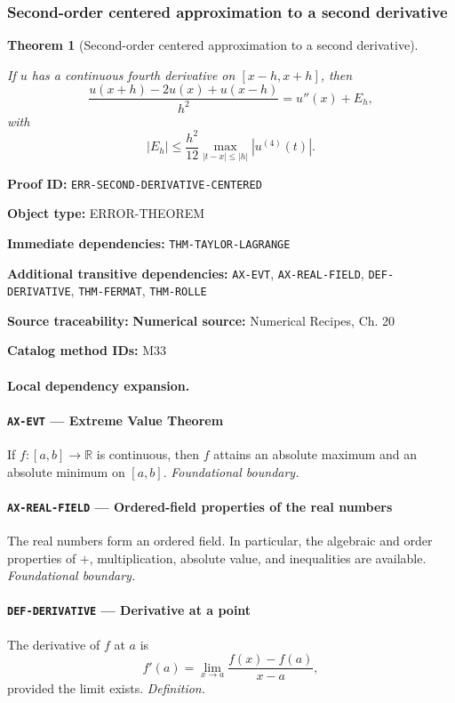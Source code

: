 \documentclass[10pt]{article}
\newcommand{\pidraw}[1]{\begingroup\urlstyle{tt}\nolinkurl{#1}\endgroup}
\newtheorem{theorem}{Theorem}[section]
\theoremstyle{definition}
\theoremstyle{remark}
\newcommand{\meta}[2]{\noindent\textbf{#1:} #2\par}
\begin{document}
\subsubsection{Second-order centered approximation to a second derivative}

\begin{theorem}[Second-order centered approximation to a second derivative]\label{prf:ERR-SECOND-DERIVATIVE-CENTERED}

If $u$ has a continuous fourth derivative on $[x-h,x+h]$, then
\[
\frac{u(x+h)-2u(x)+u(x-h)}{h^2}
=
u''(x)+E_h,
\]
with
\[
|E_h|
\le
\frac{h^2}{12}
\max_{|t-x|\le |h|}|u^{(4)}(t)|.
\]

\end{theorem}

\meta{Proof ID}{\pidraw{ERR-SECOND-DERIVATIVE-CENTERED}}
\meta{Object type}{ERROR-THEOREM}
\meta{Immediate dependencies}{\pidraw{THM-TAYLOR-LAGRANGE}}
\meta{Additional transitive dependencies}{\pidraw{AX-EVT}, \pidraw{AX-REAL-FIELD}, \pidraw{DEF-DERIVATIVE}, \pidraw{THM-FERMAT}, \pidraw{THM-ROLLE}}
\meta{Source traceability}{\textbf{Numerical source:} Numerical Recipes, Ch. 20}
\meta{Catalog method IDs}{M33}

\paragraph{Local dependency expansion.}

\paragraph{\pidraw{AX-EVT} --- Extreme Value Theorem}
If $f:[a,b]\to\mathbb{R}$ is continuous, then $f$ attains an absolute maximum and an absolute minimum on $[a,b]$.
\textit{Foundational boundary.}

\paragraph{\pidraw{AX-REAL-FIELD} --- Ordered-field properties of the real numbers}
The real numbers form an ordered field. In particular, the algebraic and order properties of $+$, multiplication, absolute value, and inequalities are available.
\textit{Foundational boundary.}

\paragraph{\pidraw{DEF-DERIVATIVE} --- Derivative at a point}
The derivative of $f$ at $a$ is
\[
f'(a)=\lim_{x\to a}\frac{f(x)-f(a)}{x-a},
\]
provided the limit exists.
\textit{Definition.}
\end{document}
